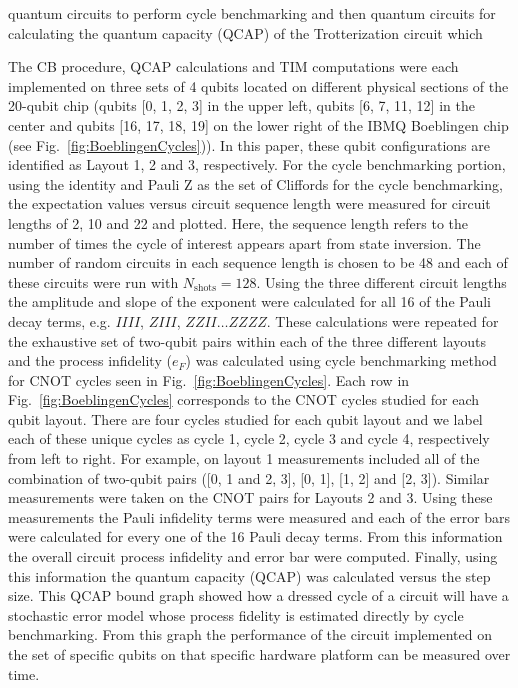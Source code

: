 quantum circuits to perform cycle benchmarking and then quantum circuits for calculating the quantum capacity (QCAP) of the Trotterization circuit which





The CB procedure, QCAP calculations and TIM computations were each implemented on three sets of 4 qubits located on different physical sections of the 20-qubit chip (qubits [0, 1, 2, 3] in the upper left, qubits [6, 7, 11, 12] in the center and qubits [16, 17, 18, 19] on the lower right of the IBMQ Boeblingen chip (see Fig.~\ref{fig:BoeblingenCycles})).  In this paper, these qubit configurations are identified as Layout 1, 2 and 3, respectively.  For the cycle benchmarking portion, using the identity and Pauli Z as the set of Cliffords for the cycle benchmarking, the expectation values versus circuit sequence length were measured for circuit lengths of 2, 10 and 22 and plotted. Here, the sequence length refers to the number of times the cycle of interest appears apart from state inversion. The number of random circuits in each sequence length is chosen to be 48 and each of these circuits were run with $N_{\text{shots}}=128$. Using the three different circuit lengths the amplitude and slope of the exponent were calculated for all 16 of the Pauli decay terms, e.g. $IIII$, $ZIII$, $ZZII \dots ZZZZ$.
These calculations were repeated for the exhaustive set of two-qubit pairs within each of the three different layouts and the process infidelity ($e_{F}$) was calculated using cycle benchmarking method for CNOT cycles seen in Fig.~\ref{fig:BoeblingenCycles}. Each row in Fig.~\ref{fig:BoeblingenCycles} corresponds to the CNOT cycles  studied for each qubit layout. There are four cycles studied for each qubit layout and we label each of these unique cycles as cycle 1, cycle 2, cycle 3 and cycle 4, respectively from left to right. For example, on layout 1 measurements included all of the combination of two-qubit pairs ([0, 1 and 2, 3], [0, 1], [1, 2] and [2, 3]).  Similar measurements were taken on the CNOT pairs for Layouts 2 and 3.   Using these measurements the Pauli infidelity terms were measured and each of the error bars were calculated for every one of the 16 Pauli decay terms.  From this information the overall circuit process infidelity and error bar were computed.  Finally, using this information the quantum capacity (QCAP) was calculated versus the step size.  This QCAP bound graph showed how a dressed cycle of a circuit will have a stochastic error model whose process fidelity is estimated directly by cycle benchmarking.  From this graph the performance of the circuit implemented on the set of specific qubits on that specific hardware platform can be measured over time.  


